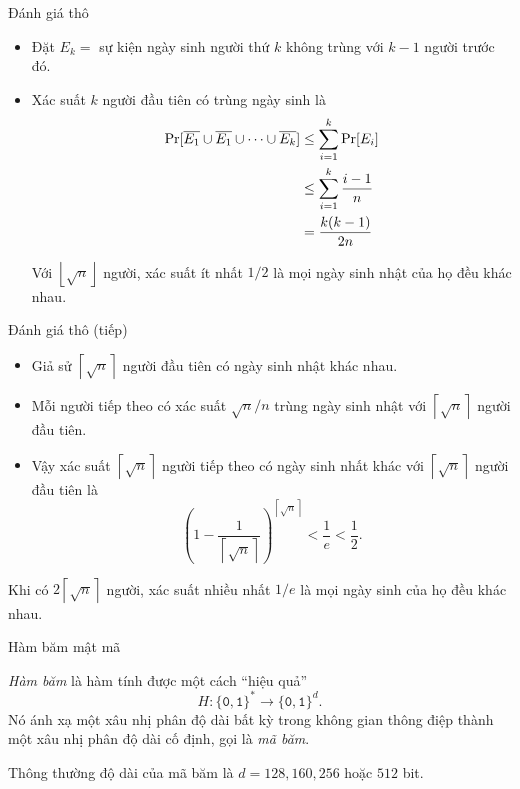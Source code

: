 \begin{frame}{Đánh giá thô}
\begin{itemize}
	\item Đặt $E_k = $ sự kiện ngày sinh người thứ $k$ {\color{red}không} trùng với $k-1$ người trước đó. 

	\item Xác suất $k$ người đầu tiên có trùng ngày sinh là
	\begin{align*}
		\mathrm{Pr} [\overline{E_1} \cup \overline{E_1} \cup \cdots \cup \overline{E_k} ] &\leq \sum_{i=1}^{k} \mathrm{Pr}[E_i]\\
		                                                                          &\leq \sum_{i=1}^{k} \frac{i-1}{n}\\
																				  &=  \frac{k(k-1)}{2n}\\
	\end{align*}
	
	\vspace{-0.3cm}
	\begin{block}{}
		Với $\left\lfloor \sqrt{n}\right\rfloor$ người, xác suất ít nhất $1/2$ là mọi ngày sinh nhật của họ đều khác nhau. 
	\end{block}   
	
\end{itemize}
\end{frame}

\begin{frame}{Đánh giá thô (tiếp)}
	\begin{itemize}
		\item Giả sử $\left\lceil\sqrt{n}\right \rceil$ người đầu tiên có ngày sinh nhật khác nhau.
		\item Mỗi người tiếp theo có xác suất $\sqrt{n}/n$ trùng ngày sinh nhật với $\left\lceil \sqrt{n}\right\rceil$ người đầu tiên.
		\item Vậy xác suất $\left\lceil \sqrt{n}\right\rceil$ người tiếp theo có ngày sinh nhất khác với   $\left\lceil\sqrt{n}\right\rceil$ người đầu tiên là 
		\[
			\left(1- \frac{1}{\left\lceil \sqrt{n}\right\rceil}\right)^{\left\lceil \sqrt{n}\right\rceil}<\frac{1}{e} < \frac{1}{2}.
		\]
		\end{itemize}
	\begin{block}{}
		Khi có $2\left\lceil \sqrt{n} \right\rceil$ người, xác suất nhiều nhất  $1/e$ là mọi ngày sinh của họ  đều khác nhau.

	\end{block}
\end{frame}
\begin{frame}{Hàm băm mật mã}
	\begin{dfntn}
	  \textit{Hàm băm}  là hàm tính được một cách ``hiệu quả''
	  \[
	  H: \{\mathtt{0},\mathtt{1}\}^* \rightarrow \{\mathtt{0},\mathtt{1}\}^d.
	  \]
	  Nó ánh xạ   một xâu nhị phân  độ dài bất kỳ trong không gian thông điệp thành một xâu nhị phân độ
	  dài cố định, gọi là \textit{mã băm}.
	\end{dfntn}

	Thông thường độ dài của mã  băm là   $d= 128, 160, 256$ hoặc  $512$ bit.
\end{frame}

